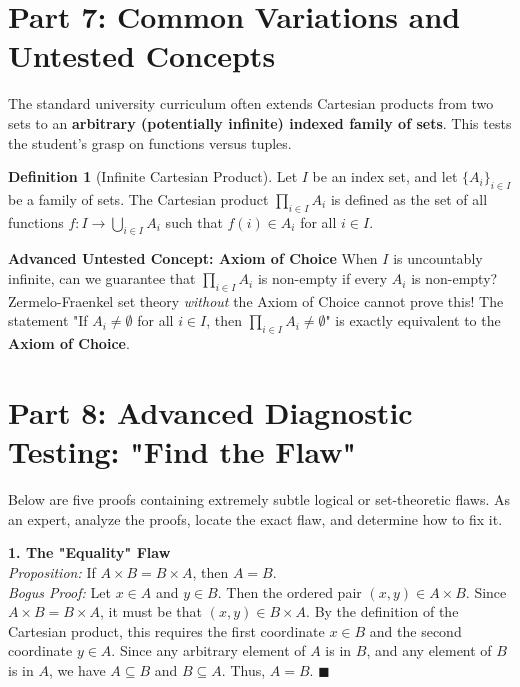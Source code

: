 \documentclass[12pt]{article}
\theoremstyle{definition}
\newtheorem{definition}{Definition}[section]
\theoremstyle{remark}
\begin{document}
\section{Part 7: Common Variations and Untested Concepts}

The standard university curriculum often extends Cartesian products from two sets to an \textbf{arbitrary (potentially infinite) indexed family of sets}. This tests the student's grasp on functions versus tuples.

\begin{definition}[Infinite Cartesian Product]
Let $I$ be an index set, and let $\{A_i\}_{i \in I}$ be a family of sets. The Cartesian product $\prod_{i \in I} A_i$ is defined as the set of all functions $f: I \to \bigcup_{i \in I} A_i$ such that $f(i) \in A_i$ for all $i \in I$.
\end{definition}

\textbf{Advanced Untested Concept: Axiom of Choice}
When $I$ is uncountably infinite, can we guarantee that $\prod_{i \in I} A_i$ is non-empty if every $A_i$ is non-empty? 
Zermelo-Fraenkel set theory \textit{without} the Axiom of Choice cannot prove this! The statement "If $A_i \neq \emptyset$ for all $i \in I$, then $\prod_{i \in I} A_i \neq \emptyset$" is exactly equivalent to the \textbf{Axiom of Choice}.

\section{Part 8: Advanced Diagnostic Testing: "Find the Flaw"}

Below are five proofs containing extremely subtle logical or set-theoretic flaws. As an expert, analyze the proofs, locate the exact flaw, and determine how to fix it.

\textbf{1. The "Equality" Flaw} \\
\textit{Proposition:} If $A \times B = B \times A$, then $A = B$. \\
\textit{Bogus Proof:} Let $x \in A$ and $y \in B$. Then the ordered pair $(x, y) \in A \times B$. Since $A \times B = B \times A$, it must be that $(x, y) \in B \times A$. By the definition of the Cartesian product, this requires the first coordinate $x \in B$ and the second coordinate $y \in A$. Since any arbitrary element of $A$ is in $B$, and any element of $B$ is in $A$, we have $A \subseteq B$ and $B \subseteq A$. Thus, $A = B$. $\blacksquare$
\end{document}
